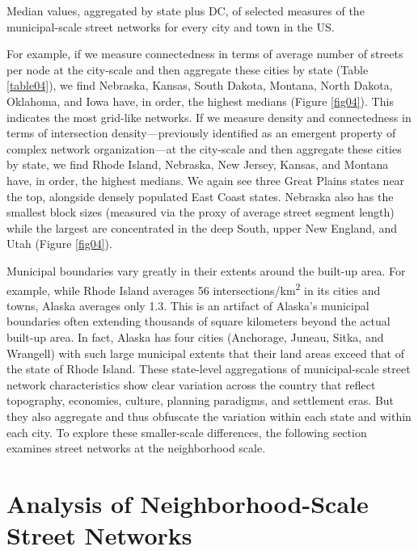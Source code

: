 \documentclass{article}
\begin{document}
\begin{table}[hp]
\caption{Median values, aggregated by state plus DC, of selected measures of the municipal-scale street networks for every city and town in the US.}
\label{table04}
\end{table}

For example, if we measure connectedness in terms of average number of streets per node at the city-scale and then aggregate these cities by state (Table \ref{table04}), we find Nebraska, Kansas, South Dakota, Montana, North Dakota, Oklahoma, and Iowa have, in order, the highest medians (Figure \ref{fig04}). This indicates the most grid-like networks. If we measure density and connectedness in terms of intersection density---previously identified as an emergent property of complex network organization---at the city-scale and then aggregate these cities by state, we find Rhode Island, Nebraska, New Jersey, Kansas, and Montana have, in order, the highest medians. We again see three Great Plains states near the top, alongside densely populated East Coast states. Nebraska also has the smallest block sizes (measured via the proxy of average street segment length) while the largest are concentrated in the deep South, upper New England, and Utah (Figure \ref{fig04}).

Municipal boundaries vary greatly in their extents around the built-up area. For example, while Rhode Island averages 56 intersections/km\textsuperscript{2} in its cities and towns, Alaska averages only 1.3. This is an artifact of Alaska's municipal boundaries often extending thousands of square kilometers beyond the actual built-up area. In fact, Alaska has four cities (Anchorage, Juneau, Sitka, and Wrangell) with such large municipal extents that their land areas exceed that of the state of Rhode Island. These state-level aggregations of municipal-scale street network characteristics show clear variation across the country that reflect topography, economies, culture, planning paradigms, and settlement eras. But they also aggregate and thus obfuscate the variation within each state and within each city. To explore these smaller-scale differences, the following section examines street networks at the neighborhood scale.

\section{Analysis of Neighborhood-Scale Street Networks}
\end{document}
